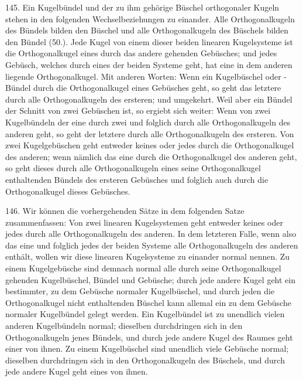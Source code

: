 \begin{center}
\makebox[15em]{\hrulefill}
\end{center}


\label{p16}


\hspace{\parindent}%
145. Ein Kugelb\"undel und der zu ihm geh\"orige B\"uschel
orthogonaler Kugeln stehen in den folgenden Wechselbeziehungen
zu einander. Alle Orthogonalkugeln des B\"undels
bilden den B\"uschel und alle Orthogonalkugeln des B\"uschels
bilden den B\"undel (50.).  Jede Kugel von einem dieser
beiden linearen Kugelsysteme ist die Orthogonalkugel eines
durch das andere gehenden Geb\"usches; und jedes Geb\"usch,
welches durch eines der beiden Systeme geht, hat eine in
dem anderen liegende Orthogonalkugel. Mit anderen Worten:
Wenn ein Kugelb\"uschel oder -B\"undel durch die Orthogonalkugel
eines Geb\"usches geht, so geht das letztere durch alle
Orthogonalkugeln des ersteren; und umgekehrt. Weil aber
ein B\"undel der Schnitt von zwei Geb\"uschen ist, so ergiebt
sich weiter: Wenn von zwei Kugelb\"undeln der eine durch
zwei und folglich durch alle Orthogonalkugeln des anderen geht,
so geht der letztere durch alle Orthogonalkugeln des ersteren.
Von zwei Kugelgeb\"uschen geht entweder keines oder jedes
durch die Orthogonalkugel des anderen; wenn n\"amlich das
eine durch die Orthogonalkugel des anderen geht, so geht
dieses durch alle Orthogonalkugeln eines seine Orthogonalkugel
enthaltenden B\"undels des ersteren Geb\"usches und folglich
auch durch die Orthogonalkugel dieses Geb\"usches.

146. Wir k\"onnen die vorhergehenden S\"atze in dem
folgenden Satze zusammenfassen: Von zwei linearen Kugelsystemen
geht entweder keines oder jedes durch alle Orthogonalkugeln
des anderen. In dem letzteren Falle, wenn
also das eine und folglich jedes der beiden Systeme alle
Orthogonalkugeln des anderen enth\"alt, wollen wir diese
linearen Kugelsysteme {\glqq}zu einander normal{\grqq} nennen. Zu
einem Kugelgeb\"usche sind demnach normal alle durch seine
Orthogonalkugel gehenden Kugelb\"uschel, B\"undel und Geb\"usche;
durch jede andere Kugel geht ein bestimmter, zu
dem Geb\"usche normaler Kugelb\"uschel, und durch jeden
die Orthogonalkugel nicht enthaltenden B\"uschel kann allemal
ein zu dem Geb\"usche normaler Kugelb\"undel gelegt
werden. Ein Kugelb\"undel ist zu unendlich vielen anderen
Kugelb\"undeln normal; dieselben durchdringen sich in den
Orthogonalkugeln jenes B\"undels, und durch jede andere Kugel
des Raumes geht einer von ihnen. Zu einem Kugelb\"uschel
sind unendlich viele Geb\"usche normal; dieselben durchdringen
sich in den Orthogonalkugeln des B\"uschels, und durch jede
andere Kugel geht eines von ihnen.

